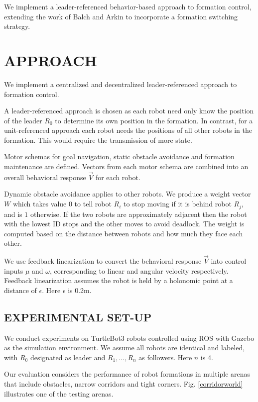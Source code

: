 \documentclass[letterpaper, 10 pt, conference]{ieeeconf}  %
\begin{document}
We implement a leader-referenced behavior-based approach to formation control, extending the work of Balch and Arkin to incorporate a formation switching strategy.

\section{APPROACH}

We implement a centralized and decentralized leader-referenced approach to formation control. 

A leader-referenced approach is chosen as each robot need only know the position of the leader $R_0$ to determine its own position in the formation. In contrast, for a unit-referenced approach each robot needs the positions of all other robots in the formation. This would require the transmission of more state.

Motor schemas for goal navigation, static obstacle avoidance and formation maintenance are defined. Vectors from each motor schema are combined into an overall behavioral response $\vec{V}$ for each robot.

Dynamic obstacle avoidance applies to other robots. We produce a weight vector $W$ which takes value $0$ to tell robot $R_i$ to stop moving if it is behind robot $R_j$, and is $1$ otherwise. If the two robots are approximately adjacent then the robot with the lowest ID stops and the other moves to avoid deadlock. The weight is computed based on the distance between robots and how much they face each other.

We use feedback linearization to convert the behavioral response $\vec{V}$ into control inputs $\mu$ and $\omega$, corresponding to linear and angular velocity respectively. Feedback linearization assumes the robot is held by a holonomic point at a distance of $\epsilon$. Here $\epsilon$ is 0.2m.

\subsection{EXPERIMENTAL SET-UP}

We conduct experiments on TurtleBot3 \cite{turtlebot} robots controlled using ROS \cite{ros} with Gazebo \cite{gazebo} as the simulation environment. We assume all robots are identical and labeled, with $R_0$ designated as leader and $R_1,...,R_n$ as followers. Here $n$ is 4.

Our evaluation considers the performance of robot formations in multiple arenas that include obstacles, narrow corridors and tight corners. Fig. \ref{corridorworld} illustrates one of the testing arenas.
\end{document}

